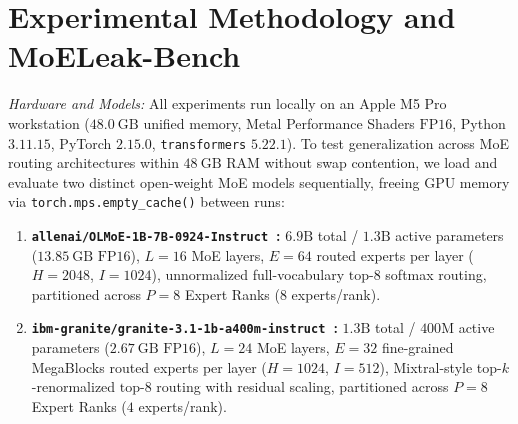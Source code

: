 \documentclass[10pt,journal,compsoc]{IEEEtran}
\theoremstyle{definition}
\theoremstyle{remark}
\begin{document}
\section{Experimental Methodology and MoELeak-Bench}\label{sec:methodology}

\emph{Hardware and Models:} All experiments run locally on an Apple M5 Pro workstation ($48.0~\mathrm{GB}$ unified memory, Metal Performance Shaders $\mathrm{FP16}$, Python $3.11.15$, PyTorch $2.15.0$, \texttt{transformers} $5.22.1$). To test generalization across MoE routing architectures within $48~\mathrm{GB}$ RAM without swap contention, we load and evaluate two distinct open-weight MoE models sequentially, freeing GPU memory via \texttt{torch.mps.empty\_cache()} between runs:
\begin{enumerate}
  \item \textbf{\texttt{allenai/OLMoE-1B-7B-0924-Instruct}~\cite{muennighoff2025olmoe}:} $6.9\mathrm{B}$ total / $1.3\mathrm{B}$ active parameters ($13.85~\mathrm{GB}$ $\mathrm{FP16}$), $L=16$ MoE layers, $E=64$ routed experts per layer ($H=2048$, $I=1024$), unnormalized full-vocabulary $\text{top-}8$ softmax routing, partitioned across $P=8$ Expert Ranks ($8$ experts/rank).
  \item \textbf{\texttt{ibm-granite/}\allowbreak\texttt{granite-3.1-}\allowbreak\texttt{1b-a400m-instruct}~\cite{gale2023megablocks}:} $1.3\mathrm{B}$ total / $400\mathrm{M}$ active parameters ($2.67~\mathrm{GB}$ $\mathrm{FP16}$), $L=24$ MoE layers, $E=32$ fine-grained MegaBlocks routed experts per layer ($H=1024$, $I=512$), Mixtral-style top-$k$-renormalized $\text{top-}8$ routing with residual scaling, partitioned across $P=8$ Expert Ranks ($4$ experts/rank).
\end{enumerate}
\end{document}
